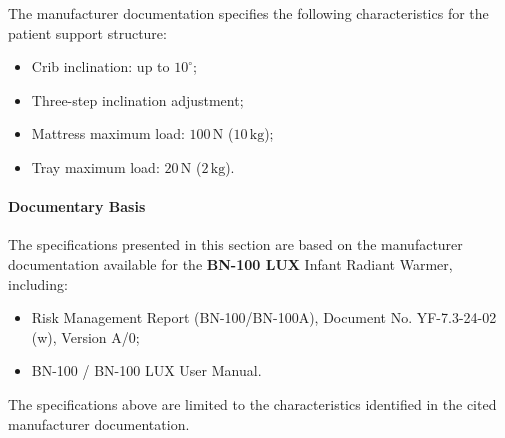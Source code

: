 The manufacturer documentation specifies the following
characteristics for the patient support structure:

\begin{itemize}
    \item Crib inclination: up to \(10^\circ\);
    \item Three-step inclination adjustment;
    \item Mattress maximum load: \(100\,\mathrm{N}\)
    (\(10\,\mathrm{kg}\));
    \item Tray maximum load: \(20\,\mathrm{N}\)
    (\(2\,\mathrm{kg}\)).
\end{itemize}


\paragraph{Documentary Basis}

The specifications presented in this section are based on the
manufacturer documentation available for the
\textbf{BN-100 LUX} Infant Radiant Warmer, including:

\begin{itemize}
    \item Risk Management Report (BN-100/BN-100A),
    Document No. YF-7.3-24-02 (w), Version A/0;
    \item BN-100 / BN-100 LUX User Manual.
\end{itemize}

The specifications above are limited to the characteristics
identified in the cited manufacturer documentation.

